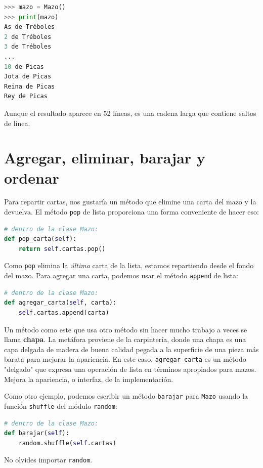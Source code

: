 \begin{lstlisting}[language=Python]
>>> mazo = Mazo()
>>> print(mazo)
As de Tréboles
2 de Tréboles
3 de Tréboles
...
10 de Picas
Jota de Picas
Reina de Picas
Rey de Picas
\end{lstlisting}

Aunque el resultado aparece en 52 líneas, es una cadena larga que contiene saltos de línea.

\section{Agregar, eliminar, barajar y ordenar}

Para repartir cartas, nos gustaría un método que elimine una carta del mazo y la devuelva. El método \texttt{pop} de lista proporciona una forma conveniente de hacer eso:

\begin{lstlisting}[language=Python]
# dentro de la clase Mazo:
def pop_carta(self):
    return self.cartas.pop()
\end{lstlisting}

Como \texttt{pop} elimina la \textit{última} carta de la lista, estamos repartiendo desde el fondo del mazo. Para agregar una carta, podemos usar el método \texttt{append} de lista:

\begin{lstlisting}[language=Python]
# dentro de la clase Mazo:
def agregar_carta(self, carta):
    self.cartas.append(carta)
\end{lstlisting}

Un método como este que usa otro método sin hacer mucho trabajo a veces se llama \textbf{chapa}. La metáfora proviene de la carpintería, donde una chapa es una capa delgada de madera de buena calidad pegada a la superficie de una pieza más barata para mejorar la apariencia. En este caso, \texttt{agregar\_carta} es un método "delgado" que expresa una operación de lista en términos apropiados para mazos. Mejora la apariencia, o interfaz, de la implementación.

Como otro ejemplo, podemos escribir un método \texttt{barajar} para \texttt{Mazo} usando la función \texttt{shuffle} del módulo \texttt{random}:

\begin{lstlisting}[language=Python]
# dentro de la clase Mazo:
def barajar(self):
    random.shuffle(self.cartas)
\end{lstlisting}

No olvides importar \texttt{random}.

